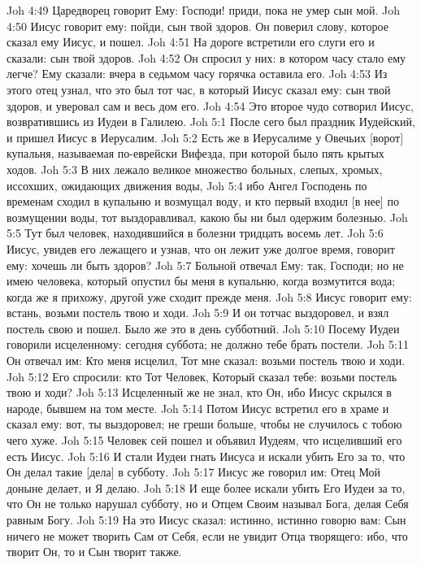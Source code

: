 Joh 4:49  Царедворец говорит Ему: Господи! приди, пока не умер сын мой.
Joh 4:50  Иисус говорит ему: пойди, сын твой здоров. Он поверил слову, которое сказал ему Иисус, и пошел.
Joh 4:51  На дороге встретили его слуги его и сказали: сын твой здоров.
Joh 4:52  Он спросил у них: в котором часу стало ему легче? Ему сказали: вчера в седьмом часу горячка оставила его.
Joh 4:53  Из этого отец узнал, что это был тот час, в который Иисус сказал ему: сын твой здоров, и уверовал сам и весь дом его.
Joh 4:54  Это второе чудо сотворил Иисус, возвратившись из Иудеи в Галилею.
Joh 5:1  После сего был праздник Иудейский, и пришел Иисус в Иерусалим.
Joh 5:2  Есть же в Иерусалиме у Овечьих [ворот] купальня, называемая по-еврейски Вифезда, при которой было пять крытых ходов.
Joh 5:3  В них лежало великое множество больных, слепых, хромых, иссохших, ожидающих движения воды,
Joh 5:4  ибо Ангел Господень по временам сходил в купальню и возмущал воду, и кто первый входил [в нее] по возмущении воды, тот выздоравливал, какою бы ни был одержим болезнью.
Joh 5:5  Тут был человек, находившийся в болезни тридцать восемь лет.
Joh 5:6  Иисус, увидев его лежащего и узнав, что он лежит уже долгое время, говорит ему: хочешь ли быть здоров?
Joh 5:7  Больной отвечал Ему: так, Господи; но не имею человека, который опустил бы меня в купальню, когда возмутится вода; когда же я прихожу, другой уже сходит прежде меня.
Joh 5:8  Иисус говорит ему: встань, возьми постель твою и ходи.
Joh 5:9  И он тотчас выздоровел, и взял постель свою и пошел. Было же это в день субботний.
Joh 5:10  Посему Иудеи говорили исцеленному: сегодня суббота; не должно тебе брать постели.
Joh 5:11  Он отвечал им: Кто меня исцелил, Тот мне сказал: возьми постель твою и ходи.
Joh 5:12  Его спросили: кто Тот Человек, Который сказал тебе: возьми постель твою и ходи?
Joh 5:13  Исцеленный же не знал, кто Он, ибо Иисус скрылся в народе, бывшем на том месте.
Joh 5:14  Потом Иисус встретил его в храме и сказал ему: вот, ты выздоровел; не греши больше, чтобы не случилось с тобою чего хуже.
Joh 5:15  Человек сей пошел и объявил Иудеям, что исцеливший его есть Иисус.
Joh 5:16  И стали Иудеи гнать Иисуса и искали убить Его за то, что Он делал такие [дела] в субботу.
Joh 5:17  Иисус же говорил им: Отец Мой доныне делает, и Я делаю.
Joh 5:18  И еще более искали убить Его Иудеи за то, что Он не только нарушал субботу, но и Отцем Своим называл Бога, делая Себя равным Богу.
Joh 5:19  На это Иисус сказал: истинно, истинно говорю вам: Сын ничего не может творить Сам от Себя, если не увидит Отца творящего: ибо, что творит Он, то и Сын творит также.
